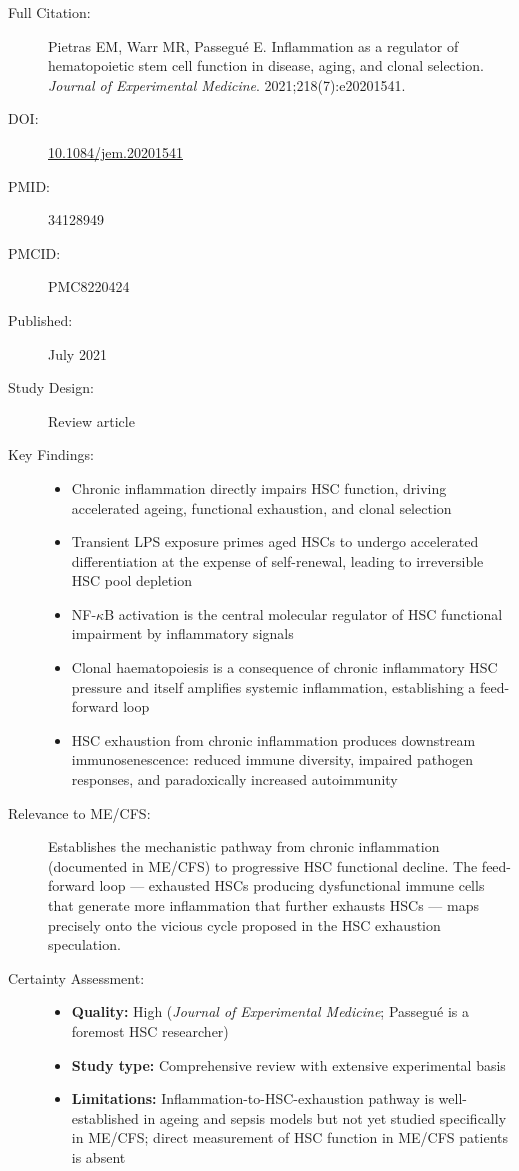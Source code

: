 \begin{description}
    \item[Full Citation:] Pietras EM, Warr MR, Passegué E. Inflammation as a regulator of hematopoietic stem cell function in disease, aging, and clonal selection. \textit{Journal of Experimental Medicine}. 2021;218(7):e20201541.
    \item[DOI:] \href{https://doi.org/10.1084/jem.20201541}{10.1084/jem.20201541}
    \item[PMID:] 34128949
    \item[PMCID:] PMC8220424
    \item[Published:] July 2021
    \item[Study Design:] Review article
    \item[Key Findings:]
    \begin{itemize}
        \item Chronic inflammation directly impairs HSC function, driving accelerated ageing, functional exhaustion, and clonal selection
        \item Transient LPS exposure primes aged HSCs to undergo accelerated differentiation at the expense of self-renewal, leading to irreversible HSC pool depletion
        \item NF-$\kappa$B activation is the central molecular regulator of HSC functional impairment by inflammatory signals
        \item Clonal haematopoiesis is a consequence of chronic inflammatory HSC pressure and itself amplifies systemic inflammation, establishing a feed-forward loop
        \item HSC exhaustion from chronic inflammation produces downstream immunosenescence: reduced immune diversity, impaired pathogen responses, and paradoxically increased autoimmunity
    \end{itemize}
    \item[Relevance to ME/CFS:] Establishes the mechanistic pathway from chronic inflammation (documented in ME/CFS) to progressive HSC functional decline. The feed-forward loop --- exhausted HSCs producing dysfunctional immune cells that generate more inflammation that further exhausts HSCs --- maps precisely onto the vicious cycle proposed in the HSC exhaustion speculation.
    \item[Certainty Assessment:]
    \begin{itemize}
        \item \textbf{Quality:} High (\textit{Journal of Experimental Medicine}; Passegué is a foremost HSC researcher)
        \item \textbf{Study type:} Comprehensive review with extensive experimental basis
        \item \textbf{Limitations:} Inflammation-to-HSC-exhaustion pathway is well-established in ageing and sepsis models but not yet studied specifically in ME/CFS; direct measurement of HSC function in ME/CFS patients is absent
    \end{itemize}
\end{description}

